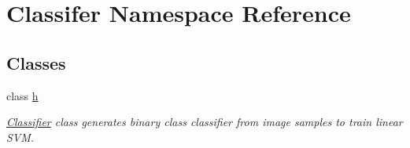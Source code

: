 \hypertarget{namespaceClassifer}{}\section{Classifer Namespace Reference}
\label{namespaceClassifer}
\subsection*{Classes}
\begin{DoxyCompactItemize}
\item 
class \hyperlink{classClassifer_1_1h}{h}
\begin{DoxyCompactList}\small\item\em \hyperlink{classClassifier}{Classifier} class generates binary class classifier from image samples  to train linear S\+VM. \end{DoxyCompactList}\end{DoxyCompactItemize}
